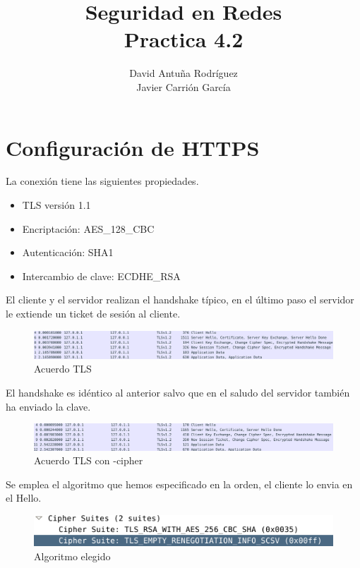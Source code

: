 \documentclass[11pt]{article}
\title{\Large Seguridad en Redes\\Practica 4.2}
\author{David Antuña Rodríguez\\Javier Carrión García}
\date{}
\begin{document}
  \raggedright

  \maketitle
  \newpage

  \section{Configuración de HTTPS}
    \par
    La conexión tiene las siguientes propiedades.
    \begin{itemize}
      \item TLS versión 1.1
      \item Encriptación: AES\_128\_CBC
      \item Autenticación: SHA1
      \item Intercambio de clave: ECDHE\_RSA
    \end{itemize}

    \par
    El cliente y el servidor realizan el handshake típico, en el último paso
    el servidor le extiende un ticket de sesión al cliente.

    \begin{figure}[H]
      \centering
      \includegraphics[width = \textwidth]{tls1}
      \caption{Acuerdo TLS}
    \end{figure}


    \par
    El handshake es idéntico al anterior salvo que en el saludo del servidor
    también ha enviado la clave.

    \begin{figure}[H]
      \centering
      \includegraphics[width = \textwidth]{tls2}
      \caption{Acuerdo TLS con -cipher}
    \end{figure}

    \par
    Se emplea el algoritmo que hemos especificado en la orden, el cliente lo envia en el Hello.

    \begin{figure}[H]
      \centering
      \includegraphics[width = \textwidth]{alg}
      \caption{Algoritmo elegido}
    \end{figure}
\end{document}
